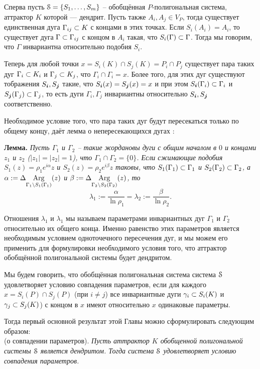 Сперва пусть ${\EuScript S}=\{S_1,\ldots,S_m\}$ -- обобщённая $P$-полигональная система, аттрактор $K$ которой --- дендрит.
Пусть также $A_i,A_j\in V_P$, тогда существует единственная дуга $\Gamma_{ij}\subset K$ с концами в этих точках.
Если $S_i(A_i)=A_i$, то существует дуга $\Gamma\subset\Gamma_{ij}$ с концом в $A_i$ такая, что $S_i(\Gamma)\subset\Gamma$.
Тогда мы говорим, что $\Gamma$ инвариантна относительно подобия $S_i$.

Теперь для любой точки $x=S_i(K)\cap S_j(K)=P_i\cap P_j$ существует пара таких дуг $\Gamma_i\subset K_i$ и $\Gamma_j\subset K_j$, что $\Gamma_i\cap\Gamma_i=x$.
Более того, для этих дуг существуют тображения $S_{\bm{i}}, S_{\bm{j}}$ такие, что $S_{\bm{i}}(x)=S_{\bm{j}}(x)=x$ и при этом $S_{\bm{i}}(\Gamma_i)\subset\Gamma_i$ и $S_{\bm{j}}(\Gamma_j)\subset\Gamma_j$, то есть дуги $\Gamma_i, \Gamma_j$ инвариантны относительно $S_{\bm{i}}, S_{\bm{j}}$ соответственно.

Необходимое условие того, что пара таких дуг будут пересекаться только по общему концу, даёт лемма о непересекающихся дугах \cite{ATK}:

{\bf Лемма.}
{\em Пусть $\Gamma_1$ и $\Gamma_2$ -- такие жордановы дуги с общим началом в $0$ и  концами $z_1$ и $z_2$ ($|z_1|=|z_2|=1$), что $\Gamma_1\cap\Gamma_2=\{0\}$.
Если сжимающие подобия $S_1(z)=\rho_1 e^{i\alpha}z$ и $S_2(z)=\rho_2 e^{i\beta}z$ таковы, что $S_1(\Gamma_1)\subset\Gamma_1$ и $S_2(\Gamma_2)\subset\Gamma_2$, 
а $\alpha:=\Delta\underset{{\Gamma_1\setminus S_1(\Gamma_1)}}{\mathrm {Arg}}(z)$ и $\beta:=\Delta\underset{{\Gamma_2\setminus S_2(\Gamma_2)}}{\mathrm {Arg}}(z)$, то
$$\lambda_1:=\dfrac{\alpha}{\ln\rho_1} = \lambda_2:=\dfrac{\beta}{\ln\rho_2}.$$}

Отношения $\lambda_1$ и $\lambda_1$ мы называем параметрами инвариантных дуг $\Gamma_1$ и $\Gamma_2$ относительно их общего конца.
Именно равенство этих параметров является необходимым условием одноточечного пересечения дуг, и мы можем его применить для формулировки необходимого условия того, что аттрактор обобщённой полигональной системы будет дендритом.

Мы будем говорить, что обобщённая полигональная система система ${\EuScript S}$ удовлетворяет условию совпадения параметров, если для каждого $x=S_i(P)\cap S_j(P)$ (при $i\neq j$) все инвариантные дуги $\gamma_i\subset S_i(K)$ и $\gamma_j\subset S_j(K)$) с концом в $x$ имеют относительно $x$ одинаковые параметры.

Тогда первый основной результат этой Главы можно сформулировать следующим образом:\\

 (о совпадении параметров). 
{\em
Пусть аттрактор $K$ обобщенной полигональной системы ${\EuScript S}$ является дендритом. 
Тогда система ${\EuScript S}$ удовлетворяет условию совпадения параметров.}

